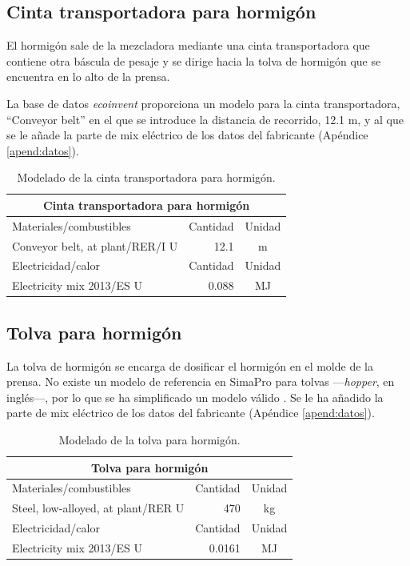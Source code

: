 \subsection{Cinta transportadora para hormigón}

El hormigón sale de la mezcladora mediante una cinta transportadora que contiene otra báscula de pesaje y se dirige hacia la tolva de hormigón que se encuentra en lo alto de la prensa.

La base de datos \textit{ecoinvent} proporciona un modelo para la cinta transportadora, ``Conveyor belt'' en el que se introduce la distancia de recorrido, 12.1 \si{m}, y al que se le añade la parte de mix eléctrico de los datos del fabricante (Apéndice \ref{apend:datos}).

\begin{table}[!htb]
\centering
\begin{tabular}{p{8cm}rc}
\toprule
\multicolumn{3}{c}{Cinta transportadora para hormigón}\\
\midrule
Materiales/combustibles & Cantidad & Unidad\\
\midrule
Conveyor belt, at plant/RER/I U & 12.1 & \si{m}\\
\midrule
Electricidad/calor & Cantidad & Unidad\\
\midrule
Electricity mix 2013/ES U & 0.088 & \si{MJ}\\
\bottomrule
\end{tabular}
\caption{Modelado de la cinta transportadora para hormigón.}
\label{modeladodecintahormigon}
\end{table}

\subsection{Tolva para hormigón}

La tolva de hormigón se encarga de dosificar el hormigón en el molde de la prensa. No existe un modelo de referencia en SimaPro para tolvas —\textit{hopper}, en inglés—, por lo que se ha simplificado un modelo válido \cite{foodnottrash}. Se le ha añadido la parte de mix eléctrico de los datos del fabricante (Apéndice \ref{apend:datos}).

\begin{table}[!htb]
\centering
\begin{tabular}{p{8cm}rc}
\toprule
\multicolumn{3}{c}{Tolva para hormigón}\\
\midrule
Materiales/combustibles & Cantidad & Unidad\\
\midrule
Steel, low-alloyed, at plant/RER U & 470 & \si{kg}\\
\midrule
Electricidad/calor & Cantidad & Unidad\\
\midrule
Electricity mix 2013/ES U & 0.0161 & \si{MJ}\\
\bottomrule
\end{tabular}
\caption{Modelado de la tolva para hormigón.}
\label{modeladotolvahormigon}
\end{table}

